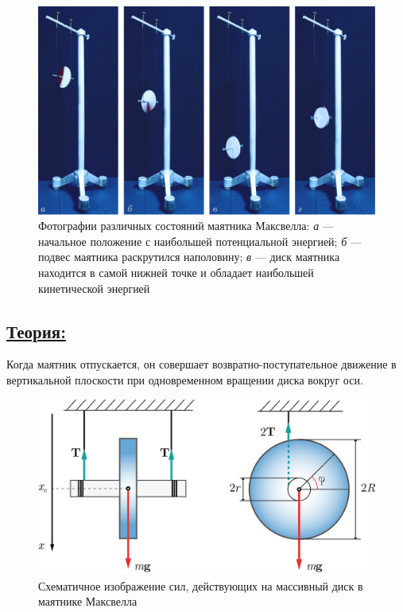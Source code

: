 \documentclass[14pt,a4paper,oneside]{extarticle}	%
\begin{document}
	 \begin{figure}[H] 	
	 	\centering 	
	 	\includegraphics[width=0.9\linewidth]{Maxwell-2.png}
	 	\caption{Фотографии различных состояний маятника Максвелла: \textit{а} — начальное положение с наибольшей потенциальной энергией; \textit{б} — подвес маятника раскрутился наполовину; \textit{в} — диск маятника находится в самой нижней точке и обладает наибольшей кинетической энергией}
	 	\label{Maxwell-2}
	 \end{figure}
	 
	 \newpage
	\subsection*{\underline{Теория:}}
		
	 Когда маятник отпускается, он совершает возвратно-поступательное движение в вертикальной плоскости при одновременном вращении диска вокруг оси.
	
		\begin{figure}[H] 	
		\centering 	
		\includegraphics[width=0.9\linewidth]{Maxwell-3.png}
		\caption{Схематичное изображение сил, действующих на массивный диск в маятнике Максвелла}
		\label{Maxwell-3}
	\end{figure}
	 
\end{document}

